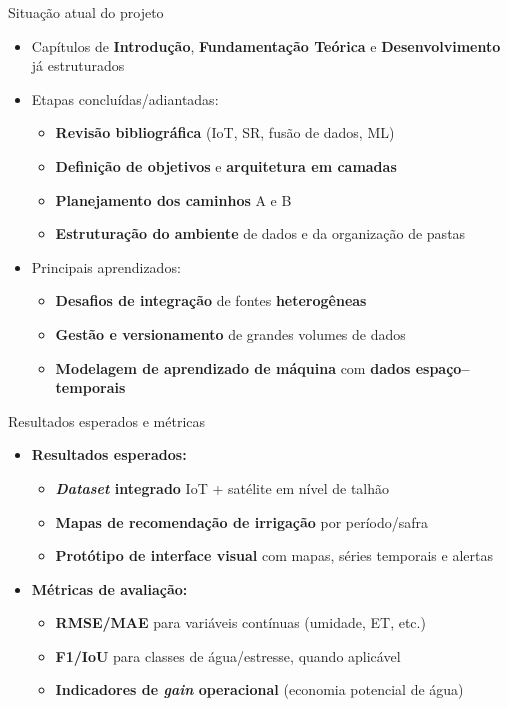 \documentclass[aspectratio=169]{beamer}
\begin{document}
\begin{frame}{Situação atual do projeto}
  \begin{itemize}
    \item Capítulos de \textbf{Introdução}, \textbf{Fundamentação Teórica} e \textbf{Desenvolvimento} já estruturados
    \item Etapas concluídas/adiantadas:
      \begin{itemize}
        \item \textbf{Revisão bibliográfica} (IoT, SR, fusão de dados, ML)
        \item \textbf{Definição de objetivos} e \textbf{arquitetura em camadas}
        \item \textbf{Planejamento dos caminhos} A e B
        \item \textbf{Estruturação do ambiente} de dados e da organização de pastas
      \end{itemize}
    \item Principais aprendizados:
      \begin{itemize}
        \item \textbf{Desafios de integração} de fontes \textbf{heterogêneas}
        \item \textbf{Gestão e versionamento} de grandes volumes de dados
        \item \textbf{Modelagem de aprendizado de máquina} com \textbf{dados espaço--temporais}
      \end{itemize}
  \end{itemize}
\end{frame}

\begin{frame}{Resultados esperados e métricas}
  \begin{itemize}
    \item \textbf{Resultados esperados:}
      \begin{itemize}
        \item \textbf{\emph{Dataset} integrado} IoT + satélite em nível de talhão
        \item \textbf{Mapas de recomendação de irrigação} por período/safra
        \item \textbf{Protótipo de interface visual} com mapas, séries temporais e alertas
      \end{itemize}
    \item \textbf{Métricas de avaliação:}
      \begin{itemize}
        \item \textbf{RMSE/MAE} para variáveis contínuas (umidade, ET, etc.)
        \item \textbf{F1/IoU} para classes de água/estresse, quando aplicável
        \item \textbf{Indicadores de \emph{gain} operacional} (economia potencial de água)
      \end{itemize}
  \end{itemize}
\end{frame}
\end{document}
